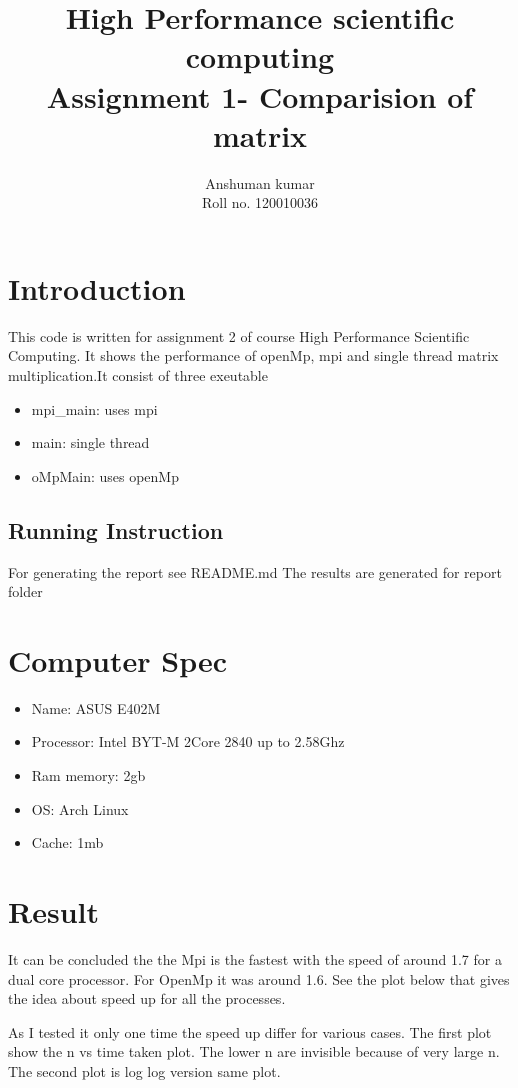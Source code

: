 \documentclass[12pt]{article}
\title {High Performance scientific computing \\
Assignment 1- Comparision of matrix }
\author {Anshuman kumar \\
Roll no.  120010036}
\begin{document}
\maketitle
\section{Introduction}
This code is written for assignment 2 of course High Performance Scientific
Computing. It shows the performance of openMp, mpi and single thread matrix
multiplication.It consist of three exeutable
\begin{itemize}
    \item mpi\_main: uses mpi
    \item main:  single thread
    \item oMpMain: uses openMp
\end{itemize}

\subsection{Running Instruction}
For generating the report see README.md
The results are generated for report folder

\section{Computer Spec}
\begin{itemize}
    \item Name: ASUS E402M
    \item Processor: Intel BYT-M 2Core 2840 up to 2.58Ghz
    \item Ram memory: 2gb
    \item OS: Arch Linux
    \item Cache: 1mb
\end{itemize}


\section{Result}
It can be concluded the the Mpi is the fastest with the speed of around 1.7 for
a dual core processor. For OpenMp it was around 1.6. See the plot below that gives
the idea about speed up for all the processes.

As I tested it only one time the speed up differ for various cases.
The first plot show the n vs time taken plot. The lower n are invisible because of
very large n.
The second plot is log log version same plot.
\end{document}
